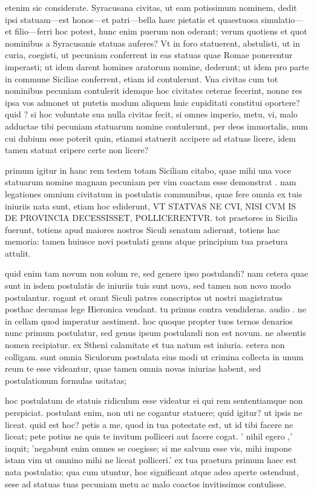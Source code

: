  etenim sic considerate. Syracusana civitas, ut eam potissimum nominem, dedit ipsi statuam—est honos—et patri—bella haec pietatis et quaestuosa simulatio—et filio—ferri hoc potest, hunc enim puerum non oderant; verum quotiens et quot nominibus a Syracusanis statuas auferes? Vt in foro statuerent, abstulisti, ut in curia, coegisti, ut pecuniam conferrent in eas statuas quae Romae ponerentur imperasti; ut idem darent homines aratorum nomine, dederunt; ut idem pro parte in commune Siciliae conferrent, etiam id contulerunt. Vna civitas cum tot nominibus pecuniam contulerit idemque hoc civitates ceterae fecerint, nonne res ipsa vos admonet ut putetis modum aliquem huic cupiditati constitui oportere? quid ? si hoc voluntate sua nulla civitas fecit, si omnes imperio, metu, vi, malo adductae tibi pecuniam statuarum nomine contulerunt, per deos immortalis, num cui dubium esse poterit quin, etiamsi statuerit accipere ad statuas licere, idem tamen statuat eripere certe non licere?

 primum igitur in hanc rem testem totam Siciliam citabo, quae mihi una voce statuarum nomine magnam pecuniam per vim coactam esse demonstrat . nam legationes omnium civitatum in postulatis communibus, quae fere omnia ex tuis iniuriis nata sunt, etiam hoc ediderunt, VT STATVAS NE CVI, NISI CVM IS DE PROVINCIA DECESSISSET, POLLICERENTVR. tot praetores in Sicilia fuerunt, totiens apud maiores nostros Siculi senatum adierunt, totiens hac memoria: tamen huiusce novi postulati genus atque principium tua praetura attulit.

 quid enim tam novum non solum re, sed genere ipso postulandi? nam cetera quae sunt in isdem postulatis de iniuriis tuis sunt nova, sed tamen non novo modo postulantur. rogant et orant Siculi patres conscriptos ut nostri magistratus posthac decumas lege Hieronica vendant. tu primus contra vendideras. audio . ne in cellam quod imperatur aestiment. hoc quoque propter tuos ternos denarios nunc primum postulatur, sed genus ipsum postulandi non est novum. ne absentis nomen recipiatur. ex Stheni calamitate et tua natum est iniuria. cetera non colligam. sunt omnia Siculorum postulata eius modi ut crimina collecta in unum reum te esse videantur, quae tamen omnia novas iniurias habent, sed postulationum formulas usitatas;

 hoc postulatum de statuis ridiculum esse videatur ei qui rem sententiamque non perspiciat. postulant enim, non uti ne cogantur statuere; quid igitur? ut ipsis ne liceat. quid est hoc? petis a me, quod in tua potestate est, ut id tibi facere ne liceat; pete potius ne quis te invitum polliceri aut facere cogat. ' nihil egero ,' inquit; 'negabunt enim omnes se coegisse; si me salvum esse vis, mihi impone istam vim ut omnino mihi ne liceat polliceri.' ex tua praetura primum haec est nata postulatio; qua cum utuntur, hoc significant atque adeo aperte ostendunt, sese ad statuas tuas pecuniam metu ac malo coactos invitissimos contulisse.

